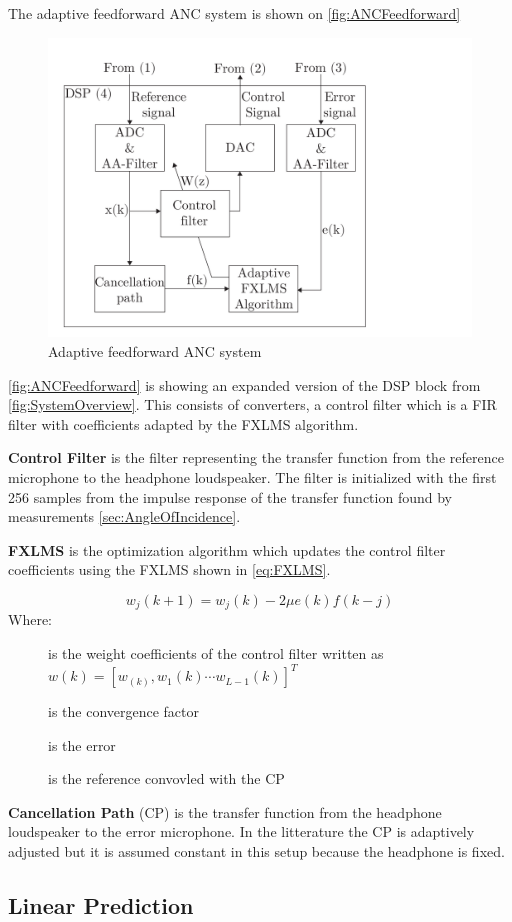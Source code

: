 The adaptive feedforward ANC system is shown on \autoref{fig:ANCFeedforward}
\begin{figure}[H]
	\centering
	\includegraphics[width=1\columnwidth]{figures/ArticleIllustrations/ANCFeedForward}
	\caption{Adaptive feedforward ANC system}
	\label{fig:ANCFeedforward}
\end{figure}
\autoref{fig:ANCFeedforward} is showing an expanded version of the DSP block from \autoref{fig:SystemOverview}. This consists of converters, a control filter which is a FIR filter with coefficients adapted by the FXLMS algorithm. 

\textbf{Control Filter} is the filter representing the transfer function from the reference microphone to the headphone loudspeaker. The filter is initialized with the first 256 samples from the impulse response of the transfer function found by measurements \autoref{sec:AngleOfIncidence}.  

\textbf{FXLMS} is the optimization algorithm which updates the control filter coefficients using the FXLMS shown in \autoref{eq:FXLMS}. 

\begin{equation}\label{eq:FXLMS}
w_j(k+1) = w_j(k) - 2\mu e(k)f(k-j)
\end{equation}
Where:
\begin{description}
	\item[] is the weight coefficients of the control filter written as  $w(k)=[w_(k),w_1(k) \cdots w_{L-1}(k)]^T$
	\item[\text{$\mu$}] is the convergence factor
	\item[] is the error 
	\item[] is the reference convovled with the CP
\end{description}

\textbf{Cancellation Path} (CP) is the transfer function from the headphone loudspeaker to the error microphone. In the litterature \cite{Hansen} the CP is adaptively adjusted but it is assumed constant in this setup because the headphone is fixed.     



\subsection*{Linear Prediction}